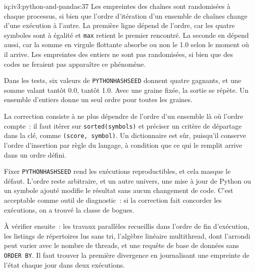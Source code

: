 \begin{solution}{iq:iv3:python-and-pandas:37}
Les empreintes des chaînes sont randomisées à chaque processus, si bien que l'ordre d'itération d'un ensemble de chaînes change d'une exécution à l'autre. La première ligne dépend de l'ordre, car les quatre symboles sont à égalité et \texttt{max} retient le premier rencontré. La seconde en dépend aussi, car la somme en virgule flottante absorbe ou non le 1.0 selon le moment où il arrive. Les empreintes des entiers ne sont pas randomisées, si bien que des codes ne feraient pas apparaître ce phénomène.

Dans les tests, six valeurs de \texttt{PYTHONHASHSEED} donnent quatre gagnants, et une somme valant tantôt 0.0, tantôt 1.0. Avec une graine fixée, la sortie se répète. Un ensemble d'entiers donne un seul ordre pour toutes les graines.

La correction consiste à ne plus dépendre de l'ordre d'un ensemble là où l'ordre compte~: il faut itérer sur \texttt{sorted(symbols)} et préciser un critère de départage dans la clé, comme \texttt{(score, symbol)}. Un dictionnaire est sûr, puisqu'il conserve l'ordre d'insertion par règle du langage, à condition que ce qui le remplit arrive dans un ordre défini.

Fixer \texttt{PYTHONHASHSEED} rend les exécutions reproductibles, et cela masque le défaut. L'ordre reste arbitraire, et un autre univers, une mise à jour de Python ou un symbole ajouté modifie le résultat sans aucun changement de code. C'est acceptable comme outil de diagnostic~: si la correction fait concorder les exécutions, on a trouvé la classe de bogues.

À vérifier ensuite~: les travaux parallèles recueillis dans l'ordre de fin d'exécution, les listings de répertoires lus sans tri, l'algèbre linéaire multithread, dont l'arrondi peut varier avec le nombre de threads, et une requête de base de données sans \texttt{ORDER BY}. Il faut trouver la première divergence en journalisant une empreinte de l'état chaque jour dans deux exécutions.

\end{solution}

